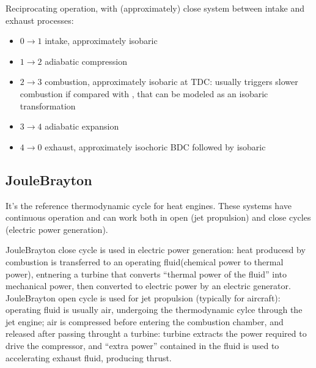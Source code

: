 \documentclass[letterpaper,10pt,english]{jupyterBook}
\begin{document}
\sphinxAtStartPar
{} Reciprocating operation, with (approximately\sphinxfootnotemark[1]) close system between intake and exhaust processes:
\begin{itemize}
\item {} 
\sphinxAtStartPar
\(0 \rightarrow 1\) intake, approximately isobaric

\item {} 
\sphinxAtStartPar
\(1 \rightarrow 2\) adiabatic compression

\item {} 
\sphinxAtStartPar
\(2 \rightarrow 3\) combustion, approximately isobaric at TDC:  usually triggers slower combustion if compared with {\hyperref[\detokenize{ch/heat-engines:classical-thermodynamics-heat-engines-real-otto}]{}}, that can be modeled as an isobaric transformation

\item {} 
\sphinxAtStartPar
\(3 \rightarrow 4\) adiabatic expansion

\item {} 
\sphinxAtStartPar
\(4 \rightarrow 0\) exhaust, approximately isochoric BDC followed by isobaric

\end{itemize}


\subsection{Joule\sphinxhyphen{}Brayton}
\label{\detokenize{ch/heat-engines:joule-brayton}}\label{\detokenize{ch/heat-engines:classical-thermodynamics-heat-engines-real-joule-brayton}}
\sphinxAtStartPar
{} It’s the reference thermodynamic cycle for  heat engines. These systems have continuous operation and can work both in open (jet propulsion) and close cycles (electric power generation).

\sphinxAtStartPar
{} Joule\sphinxhyphen{}Brayton close cycle is used in electric power generation: heat producesd by combustion is transferred to an operating fluid(chemical power to thermal power), entnering a turbine that converts “thermal power of the fluid” into mechanical power, then converted to electric power by an electric generator. Joule\sphinxhyphen{}Brayton open cycle is used for jet propulsion (typically for aircraft): operating fluid is usually air, undergoing the thermodynamic cylce through the jet engine; air is compressed before entering the combustion chamber, and released after passing throught a turbine: turbine extracts the power required to drive the compressor, and “extra power” contained in the fluid is used to accelerating exhaust fluid, producing thrust.
\end{document}
